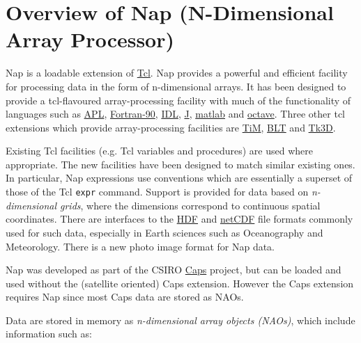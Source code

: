 
\section{Overview of Nap (N-Dimensional Array Processor)}
\label{overview}

  \par Nap is a loadable extension of 
  \href{http://wiki.tcl.tk/}{Tcl}. Nap provides a powerful and
  efficient facility for processing data in the form of n-dimensional
  arrays. It has been designed to provide a tcl-flavoured
  array-processing facility with much of the functionality of languages
  such as 
  \href{http://www.acm.org/sigapl/}{APL}, 
  \href{http://www.fortran.com/fortran/}{Fortran-90}, 
  \href{http://www.rsinc.com/idl/index.asp}{IDL}, 
  \href{http://www.jsoftware.com/}{J}, 
  \href{http://www.mathworks.com/}{matlab} and 
  \href{http://www.octave.org/}{octave}. Three other tcl
  extensions which provide array-processing facilities are 
  \href{http://www-obs.univ-lyon1.fr/\%7Ethiebaut/TiM/TiM.html}{TiM},
  \href{http://sourceforge.net/projects/blt/}{BLT} and 
  \href{http://www.gm.com/automotive/innovations/rnd/TK3/TK3D-Software-Description.html}{ Tk3D}.
  \par Existing Tcl facilities (e.g. Tcl variables and procedures) are
  used where appropriate. The new facilities have been designed to
  match similar existing ones. In particular, Nap expressions use
  conventions which are essentially a superset of those of the Tcl 
  \texttt{expr} command. Support is provided for data based on 
  \emph{n-dimensional grids}, where the dimensions correspond to
  continuous spatial coordinates. There are interfaces to the 
  \href{http://hdf.ncsa.uiuc.edu}{HDF} and 
  \href{http://www.unidata.ucar.edu/packages/netcdf/index.html}{netCDF}
  file formats commonly used for such data, especially in Earth
  sciences such as Oceanography and Meteorology. There is a new photo
  image format for Nap data.
  \par Nap was developed as part of the CSIRO 
\href{http://www.eoc.csiro.au/cats/caps/}{Caps}
  project, but can be loaded and used without the (satellite oriented)
  Caps extension. However the Caps extension requires Nap since most
  Caps data are stored as NAOs.
  \par Data are stored in memory as 
  \emph{n-dimensional array objects (NAOs)}, which include
  information such as:
